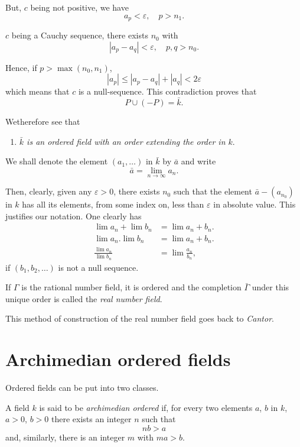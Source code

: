 But, $c$ being not positive, we have 
$$
a_p  < \varepsilon ,  \quad p > n_1 .
$$

$c$ being a Cauchy sequence, there exists $n_0$ with 
$$
| a_p -a_q | < \varepsilon , \quad  p, q > n_0 .
$$

Hence, if $ p > \max ( n_0, n_1 ) $,
$$
| a_p| \leq | a_p- a_q | +| a_q | < 2 \varepsilon  
$$
which means that $c$ is a null-sequence. This contradiction proves
that  
$$
P \cup ( - P ) = \bar{k}.
$$

We\pageoriginale therefore see that 
\begin{enumerate}
\renewcommand{\labelenumi}{(\theenumi)}
\setcounter{enumi}{2}
\item \textit{$ \bar{k} $ is an ordered field with an order extending
  the order in  $k$}.
\end{enumerate}


We shall denote the element $ ( a_1 ,\ldots ) $ in $ \bar{k} $ by $
\bar{a} $ and write  
$$
\bar{a} = \lim_{n \rightarrow \infty } a_n .
$$ 


Then, clearly, given any $ \varepsilon > 0 $, there exists $ n_0 $
such that the element $ \bar{a} - ( a_{n_{0}})$ in $k$  has all its
elements, from some index on, less than $ \varepsilon $ in absolute
value. This justifies our notation. One clearly has  
\begin{align*}
\lim a_n + \lim b_n &= \lim a_n + b_n .\\
\lim a_n . \lim b_n &= \lim a_n + b_n .\\
\frac{\lim a_n}{\lim b_n} &=  \lim \frac{a_n}{b_n},
 \end{align*} 
 if $ ( b_1 ,b_2, \ldots) $  is not a null sequence.
 
 If $ \Gamma $  is the rational number field, it is ordered and the
 completion $ \bar{\Gamma} $ under this unique order is called the
 \textit{real number field}.  
 
 This method of construction of the real number field goes back to
 \textit{Cantor}. 
 

 \section{Archimedian ordered fields}\label{c7:s5}%
 
 Ordered fields can be put into two classes. 
 
 A field $k$ is said to be \textit{archimedian ordered} if, for every
 two elements $ a$, $b $ in $ k$, $ a > 0 $, $ b > 0 $ there exists
 an integer $n$ such that  
 $$
 n b > a
 $$\pageoriginale
and, similarly, there is an integer  $m$ with  $ma > b$.

